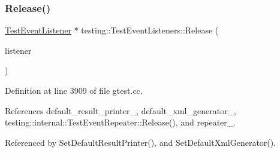 \mbox{\label{classtesting_1_1TestEventListeners_a038c9fa1975f84d6f3d25b52bc7bccdd}} 
\subsubsection{\texorpdfstring{Release()}{Release()}}
{\footnotesize\ttfamily \hyperlink{classtesting_1_1TestEventListener}{Test\+Event\+Listener} $\ast$ testing\+::\+Test\+Event\+Listeners\+::\+Release (\begin{DoxyParamCaption}\item[{\hyperlink{classtesting_1_1TestEventListener}{Test\+Event\+Listener} $\ast$}]{listener }\end{DoxyParamCaption})}



Definition at line 3909 of file gtest.\+cc.



References default\+\_\+result\+\_\+printer\+\_\+, default\+\_\+xml\+\_\+generator\+\_\+, testing\+::internal\+::\+Test\+Event\+Repeater\+::\+Release(), and repeater\+\_\+.



Referenced by Set\+Default\+Result\+Printer(), and Set\+Default\+Xml\+Generator().


